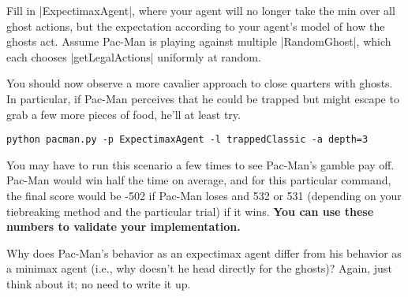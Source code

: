 \item {}
Fill in |ExpectimaxAgent|, where your agent will no longer take the min over all ghost actions, but the expectation according to your agent's model of how the ghosts act. Assume Pac-Man is playing against multiple |RandomGhost|, which each chooses |getLegalActions| uniformly at random.

You should now observe a more cavalier approach to close quarters with ghosts. In particular, if Pac-Man perceives that he could be trapped but might escape to grab a few more pieces of food, he'll at least try.

\begin{lstlisting}
python pacman.py -p ExpectimaxAgent -l trappedClassic -a depth=3
\end{lstlisting}

You may have to run this scenario a few times to see Pac-Man's gamble pay off. Pac-Man would win half the time on average, and for this particular command, the final score would be -502 if Pac-Man loses and 532 or 531 (depending on your tiebreaking method and the particular trial) if it wins. {\bf You can use these numbers to validate your implementation.}

Why does Pac-Man's behavior as an expectimax agent differ from his behavior as a minimax agent (i.e., why doesn't he head directly for the ghosts)? Again, just think about it; no need to write it up.
